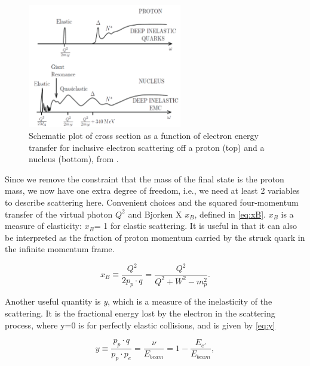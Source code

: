         \begin{figure}[ht]
            \centering
            \includegraphics[width=0.6\textwidth]{Chapters/Ch1-Intro/Ch1-Sec1-Background/pics/intro/scatcrosstheory.png}
            \caption[Scattering Cross Section vs. Energy Transfer]{Schematic plot of cross section as a function of electron energy transfer for inclusive electron scattering off a proton (top) and a nucleus (bottom), from \parencite{Donnelly2017FoundationsPhysics}. }
            \label{fig:ScatteringvsW}
        \end{figure}


        Since we remove the constraint that the mass of the final state is the proton mass, we now have one extra degree of freedom, i.e., we need at least 2 variables to describe scattering here. Convenient choices and the squared four-momentum transfer of the virtual photon $Q^2$ and Bjorken X $x_B$, defined in \eqref{eq:xB}. $x_B$ is a measure of elasticity: $x_B$= 1 for elastic scattering. It is useful in that it can also be interpreted as the fraction of proton momentum carried by the struck quark in the infinite momentum frame.       %

        \begin{equation}\label{eq:xB}
            x_B \equiv \frac{Q^2}{2p_p\cdot q} = \frac{Q^2}{Q^2+W^2-m_p^2}.
        \end{equation}


        Another useful quantity is \textit{y}, which is a measure of the inelasticity of the scattering. It is the fractional energy lost by the electron in the scattering process, where y=0 is for perfectly elastic collisions, and is given by \eqref{eq:y}
        
        \begin{equation}\label{eq:y}
            y \equiv \frac{p_p \cdot q}{p_p \cdot p_e} = \frac{\nu}{E_{beam}} =  1 - \frac{E_{e'}}{E_{beam}},
        \end{equation}

